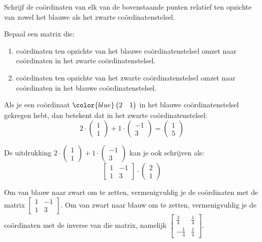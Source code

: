\documentclass{ximera}
\begin{document}
\begin{exercise}
Schrijf de coördinaten van elk van de bovenstaande punten relatief ten opzichte van zowel het blauwe als het zwarte coördinatenstelsel.
\end{exercise}

\begin{exercise}
Bepaal een matrix die:
\begin{enumerate}
\item coördinaten ten opzichte van het blauwe coördinatenstelsel omzet naar coördinaten in het zwarte coördinatenstelsel.
\item coördinaten ten opzichte van het zwarte coördinatenstelsel omzet naar coördinaten in het blauwe coördinatenstelsel.
\end{enumerate}
\begin{hint}
Als je een coördinaat \(\color{blue}\begin{pmatrix} 2 & 1\end{pmatrix}\) in het blauwe coördinatenstelsel gekregen hebt, dan betekent dat in het zwarte coördinatenstelsel:
\[
2\cdot \begin{pmatrix} 1 \\ 1 \end{pmatrix} + 1 \cdot \begin{pmatrix} -1 \\ 3 \end{pmatrix} = \begin{pmatrix} 1 \\ 5 \end{pmatrix}
\]
\end{hint}
\begin{hint}
De uitdrukking \(2\cdot \begin{pmatrix} 1 \\ 1 \end{pmatrix} + 1 \cdot \begin{pmatrix} -1 \\ 3 \end{pmatrix}\) kan je ook schrijven als:
\[\begin{bmatrix} 1 & -1 \\ 1 & 3 \end{bmatrix} \cdot \begin{pmatrix} 2 \\ 1 \end{pmatrix}\]
\end{hint}
\begin{oplossing}
Om van blauw naar zwart om te zetten, vermenigvuldig je de coördinaten met de matrix \(\begin{bmatrix} 1 & -1 \\ 1 & 3 \end{bmatrix}\).\newline
Om van zwart naar blauw om te zetten, vermenigvuldig je de coördinaten met de inverse van die matrix, namelijk \(\begin{bmatrix} \frac{3}{4} & \frac{1}{4} \\ -\frac{1}{4} & \frac{1}{4} \end{bmatrix}\).
\end{oplossing}
\end{exercise}
\end{document}
